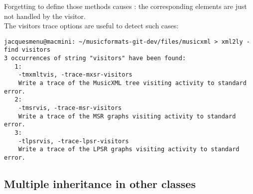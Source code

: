 Forgetting to define those  methods causes : the corresponding elements are just not handled by the visitor.\\
The visitors trace options are useful to detect such cases:
\begin{lstlisting}[language=Terminal]
jacquesmenu@macmini: ~/musicformats-git-dev/files/musicxml > xml2ly -find visitors
3 occurrences of string "visitors" have been found:
   1:
    -tmxmltvis, -trace-mxsr-visitors
    Write a trace of the MusicXML tree visiting activity to standard error.
   2:
    -tmsrvis, -trace-msr-visitors
    Write a trace of the MSR graphs visiting activity to standard error.
   3:
    -tlpsrvis, -trace-lpsr-visitors
    Write a trace of the LPSR graphs visiting activity to standard error.
\end{lstlisting}


\subsection{Multiple inheritance in other classes}

